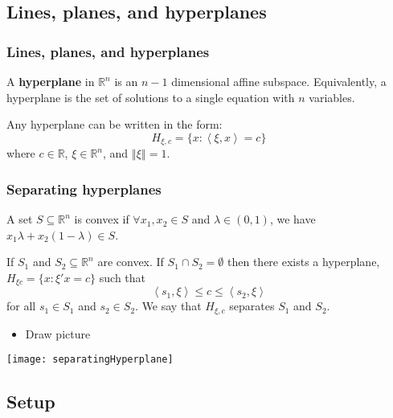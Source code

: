 \documentclass[compress]{beamer}
\def\R{\mathbb{R}}
\newcommand{\iprod}[2]{\left\langle {#1} , {#2} \right\rangle}
\newcommand{\norm}[1]{\left\Vert {#1} \right\Vert}
\begin{document}
\subsection{Lines, planes, and hyperplanes }

\begin{frame}
  \frametitle{Lines, planes, and hyperplanes}
  \begin{definition}
    A \textbf{hyperplane} in $\R^n$ is an $n-1$ dimensional affine
    subspace. Equivalently, a hyperplane is the set of solutions to a
    single equation with $n$ variables.
  \end{definition}
  Any hyperplane can be written in the form:
  \[ H_{\xi,c} = \{x: \iprod{\xi}{x} = c \} \] where $c \in \R$, $\xi \in
  \R^n$, and $\norm{\xi} = 1$.
\end{frame}

\begin{frame}
  \frametitle{Separating hyperplanes}
  \begin{definition}
    A set $S \subseteq \R^n$ is convex if $\forall x_1, x_2 \in S$ and
    $\lambda \in (0,1)$, we have $x_1 \lambda + x_2(1-\lambda) \in S$.  
  \end{definition}
  \begin{theorem}
    If $S_1$ and $S_2 \subseteq \R^n$ are convex. If $S_1 \cap S_2 =
    \emptyset$ then there exists a hyperplane, $H_{\xi c} = \{ x:
    \xi'x = c \}$ such that
    \[ \iprod{s_1}{\xi} \leq c \leq \iprod{s_2}{\xi} \]
    for all $s_1 \in S_1$ and $s_2 \in S_2$. We say that $H_{\xi,c}$
    separates $S_1$ and $S_2$. 
  \end{theorem}
  \begin{itemize}
  \item Draw picture
  \end{itemize}
\end{frame}

\begin{frame}
  \begin{centering}
    \texttt{[image: separatingHyperplane]}
  \end{centering}
\end{frame}


\subsection{Setup}
\end{document}

